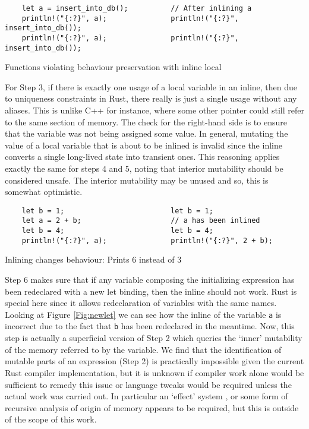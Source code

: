 \begin{fig}[H]
\begin{verbatim}
    let a = insert_into_db();          // After inlining a
    println!("{:?}", a);               println!("{:?}", insert_into_db());
    println!("{:?}", a);               println!("{:?}", insert_into_db());
\end{verbatim}
\caption{Functions violating behaviour preservation with inline local}
\label{Fig:funcinline}
\end{fig}

For Step 3, if there is exactly one usage of a local variable in an inline, then due to uniqueness constraints in Rust, there really is just a single usage without any aliases. This is unlike C++ for instance, where some other pointer could still refer to the same section of memory. The check for the right-hand side is to ensure that the variable was not being assigned some value. In general, mutating the value of a local variable that is about to be inlined is invalid since the inline converts a single long-lived state into transient ones. This reasoning applies exactly the same for steps 4 and 5, noting that interior mutability should be considered unsafe. The interior mutability may be unused and so, this is somewhat optimistic.

\begin{fig}[H]
\begin{verbatim}
    let b = 1;                         let b = 1;
    let a = 2 + b;                     // a has been inlined
    let b = 4;                         let b = 4;
    println!("{:?}", a);               println!("{:?}", 2 + b);
\end{verbatim}
\caption{Inlining changes behaviour: Prints 6 instead of 3}
\label{Fig:newlet}
\end{fig}

Step 6 makes sure that if any variable composing the initializing expression has been redeclared with a new let binding, then the inline should not work. Rust is special here since it allows redeclaration of variables with the same names. Looking at Figure \ref{Fig:newlet} we can see how the inline of the variable {\verb|a|} is incorrect due to the fact that {\verb|b|} has been redeclared in the meantime. Now, this step is actually a superficial version of Step 2 which queries the `inner' mutability of the memory referred to by the variable. We find that the identification of mutable parts of an expression (Step 2) is practically impossible given the current Rust compiler implementation, but it is unknown if compiler work alone would be sufficient to remedy this issue or language tweaks would be required unless the actual work was carried out. In particular an `effect' system \cite{effects}, or some form of recursive analysis of origin of memory appears to be required, but this is outside of the scope of this work.




